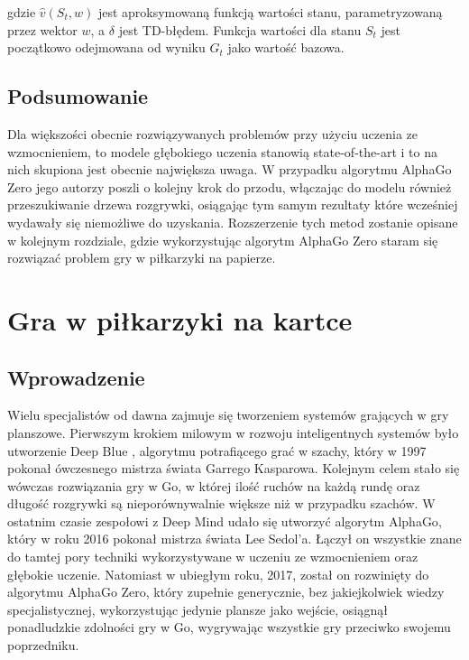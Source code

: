 \documentclass[licencjacka]{pracamgr}
\begin{document}
gdzie $ \hat{v}(S_t, w) $ jest aproksymowaną funkcją wartości stanu, parametryzowaną przez wektor $w$, a $\delta$ jest TD-błędem. Funkcja wartości dla stanu $S_t$ jest początkowo odejmowana od wyniku $G_t$ jako wartość bazowa. 

\section{Podsumowanie}

Dla większości obecnie rozwiązywanych problemów przy użyciu uczenia ze wzmocnieniem, to modele głębokiego uczenia stanowią state-of-the-art i to na nich skupiona jest obecnie największa uwaga. W przypadku algorytmu AlphaGo Zero jego autorzy poszli o kolejny krok do przodu, włączając do modelu również przeszukiwanie drzewa rozgrywki, osiągając tym samym rezultaty które wcześniej wydawały się niemożliwe do uzyskania. Rozszerzenie tych metod zostanie opisane w kolejnym rozdziale, gdzie wykorzystując algorytm AlphaGo Zero staram się rozwiązać problem gry w piłkarzyki na papierze.

\chapter{Gra w piłkarzyki na kartce}

\section{Wprowadzenie}

Wielu specjalistów od dawna zajmuje się tworzeniem systemów grających w gry planszowe. Pierwszym krokiem milowym w rozwoju inteligentnych systemów było utworzenie Deep Blue \cite{deep-blue}, algorytmu potrafiącego grać w szachy, który w 1997 pokonał ówczesnego mistrza świata Garrego Kasparowa. Kolejnym celem stało się wówczas rozwiązania gry w Go, w której ilość ruchów na każdą rundę oraz długość rozgrywki są nieporównywalnie większe niż w przypadku szachów. W ostatnim czasie zespołowi z Deep Mind udało się utworzyć algorytm AlphaGo\cite{alphago2016}, który w roku 2016 pokonał mistrza świata Lee Sedol'a. Łączył on wszystkie znane do tamtej pory techniki wykorzystywane w uczeniu ze wzmocnieniem oraz głębokie uczenie. Natomiast w ubiegłym roku, 2017, został on rozwinięty do algorytmu AlphaGo Zero\cite{alphagozero}, który zupełnie generycznie, bez jakiejkolwiek wiedzy specjalistycznej, wykorzystując jedynie plansze jako wejście, osiągnął ponadludzkie zdolności gry w Go, wygrywając wszystkie gry przeciwko swojemu poprzedniku. 
\end{document}
